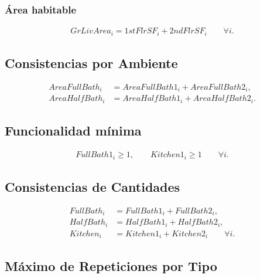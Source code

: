 \subsubsection{Área habitable}
\begin{align}
GrLivArea_{i} = 1stFlrSF_{i} + 2ndFlrSF_{i} \qquad \forall i.
\end{align}

\subsection{Consistencias por Ambiente}
\begin{align}
AreaFullBath_{i} &= AreaFullBath1_{i}+ AreaFullBath2_{i}, \\[2pt]
AreaHalfBath_{i} &= AreaHalfBath1_{i}+ AreaHalfBath2_{i}.
\end{align}

\subsection{Funcionalidad mínima}
\begin{align}
FullBath1_{i}\geq 1, \qquad Kitchen1_{i}\geq 1 \qquad \forall i.
\end{align}

\subsection{Consistencias de Cantidades}
\begin{align}
FullBath_i &= FullBath1_i + FullBath2_i, \\[2pt]
HalfBath_i &= HalfBath1_i + HalfBath2_i, \\[2pt]
Kitchen_i  &= Kitchen1_i  + Kitchen2_i \qquad \forall i.
\end{align}

\subsection{Máximo de Repeticiones por Tipo}
